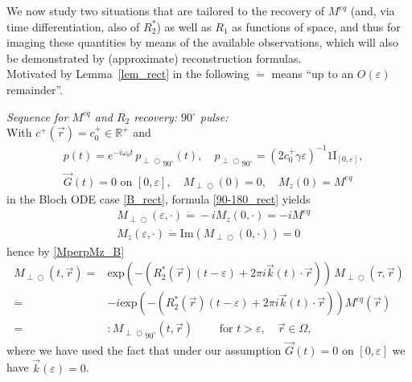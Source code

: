 \documentclass{ws-m3as}
\renewcommand\Im{\mathrm{Im}}
\def\Mpp{M_{\perp\!\!\!\!\!\bigcirc}}
\def\pp{p_{\perp\!\!\!\!\!\bigcirc}}
\newcommand\taup{\varepsilon}
\newcommand{\eexp}[1]{\text{exp}\left(#1\right)}
\newcommand{\revision}[1]{{ #1}}
\newcommand{\Margin}[1]{}
\begin{document}
\medskip

We now study two situations that are tailored to the recovery of $M^{eq}$ (and, via time differentiation, also of $R_2^*$) as well as $R_1$ as functions of space, and thus for imaging these quantities by means of the available observations, which will also be demonstrated by (approximate) reconstruction formulas. 
\\
\revision{Motivated by} Lemma~\ref{lem_rect} in the following $\dot{=}$ means ``up to an $O(\taup)$ remainder''.
\Margin{R1 6.}
  
\medskip

\noindent
\textit{Sequence for $M^{eq}$ and $R_2$ recovery: $90{}^{\circ}$ pulse:}\\[1ex]
With $c^+(\vec r)=c^+_0\in\mathbb{R}^+$ and
\begin{equation}\label{90_rect}
\begin{aligned}
&p(t)= e^{-i\omega_0t}\, {\pp}_{90^\circ}(t), \quad  {\pp}_{90^\circ}=(2c^+_0\gamma\taup)^{-1}1\!\mathrm{I}_{[0,\taup]}, \\
&\vec{G}(t)=0\text{ on } [0,\taup],\quad
\Mpp(0)=0, \quad M_z(0)=M^{eq}
\end{aligned}
\end{equation}
in the Bloch ODE case \eqref{B_rect}, formula \eqref{90-180_rect} yields
\begin{equation}\label{init90eps}
\begin{aligned}
&\Mpp(\taup,\cdot)\dot{=}-iM_z(0,\cdot)=-iM^{eq}\\
&M_z(\taup,\cdot)\dot{=}\Im(\Mpp(0,\cdot))=0
\end{aligned}
\end{equation}
hence by \eqref{MperpMz_B}
\begin{equation}\label{Mperp_ex_90_rect_B}
\begin{aligned}
\Mpp(t,\vec r)=& 
\eexp{-(R_2^*(\vec r)(t-\taup)+2\pi i {\vec k}(t)\cdot{\vec r})}\,\Mpp(\tau,\vec r)\\
\dot{=}& 
-i\eexp{-(R_2^*(\vec r)(t-\taup)+2\pi i {\vec k}(t)\cdot{\vec r})}M^{eq}(\vec r)\,\\
=&:{\Mpp}_{90^\circ}(t,\vec r)
\qquad \text{ for }t>\taup,\quad \vec r\in\Omega, 
\end{aligned}
\end{equation}
where we have used the fact that under our assumption $\vec{G}(t)=0\text{ on } [0,\taup]$ we have ${\vec k}(\taup)=0$.
\end{document}
